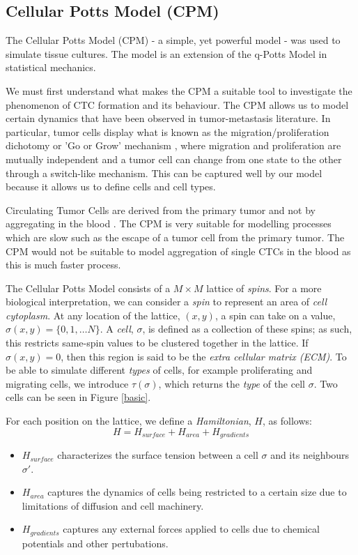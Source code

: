 \documentclass[12pt]{article}
\begin{document}
\subsection{Cellular Potts Model (CPM)}
The Cellular Potts Model (CPM) \cite{Graner1992} - a simple, yet powerful model - was used to simulate tissue cultures. The model is an extension of the q-Potts Model in statistical mechanics. 

We must first understand what makes the CPM a suitable tool to investigate the phenomenon of CTC formation and its behaviour. The CPM allows us to model certain dynamics that have been observed in tumor-metastasis literature. In particular, tumor cells display what is known as the migration/proliferation dichotomy or 'Go or Grow' mechanism \cite{Godlewski2010}\cite{Hatzikirou2012}, where migration and proliferation are mutually independent and a tumor cell can change from one state to the other through a switch-like mechanism. This can be captured well by our model because it allows us to define cells and cell types.

Circulating Tumor Cells are derived from the primary tumor and not by aggregating in the blood \cite{Aceto2014}. The CPM is very suitable for modelling processes which are slow such as the escape of a tumor cell from the primary tumor. The CPM would not be suitable to model aggregation of single CTCs in the blood as this is much faster process. 

The Cellular Potts Model consists of a $M\times M$ lattice of \emph{spins}. For a more biological interpretation, we can consider a \emph{spin} to represent an area of \emph{cell cytoplasm}. At any location of the lattice, $(x,y)$, a spin can take on a value, $\sigma(x,y) = \{0,1,\ldots N\}$. A \emph{cell}, $\sigma$, is defined as a collection of these spins; as such, this restricts same-spin values to be clustered together in the lattice. If $\sigma(x,y) = 0$, then this region is said to be the \emph{extra cellular matrix (ECM)}. To be able to simulate different \emph{types} of cells, for example proliferating and migrating cells, we introduce $\tau(\sigma)$, which returns the \emph{type} of the cell $\sigma$. Two cells can be seen in Figure \ref{basic}.

For each position on the lattice, we define a \emph{Hamiltonian}, $H$, as follows:
\begin{equation}
	H = H_{surface} + H_{area} + H_{gradients}
	\label{hamiltonian}
\end{equation}

\begin{itemize}
	\item $H_{surface}$ characterizes the surface tension between a cell $\sigma$ and its neighbours $\sigma'$.
	\item $H_{area}$ captures the dynamics of cells being restricted to a certain size due to limitations of diffusion and cell machinery. 
	\item $H_{gradients}$ captures any external forces applied to cells due to chemical potentials and other pertubations.
\end{itemize}
\end{document}
